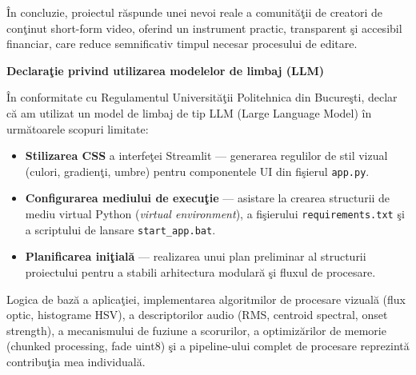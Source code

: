 \documentclass[12pt,a4paper]{article}
\begin{document}
\^{I}n concluzie, proiectul r\u{a}spunde unei nevoi reale a comunit\u{a}\c{t}ii de creatori de con\c{t}inut short-form video, oferind un instrument practic, transparent \c{s}i accesibil financiar, care reduce semnificativ timpul necesar procesului de editare.


\vspace{0.8cm}
\noindent\textbf{Declara\c{t}ie privind utilizarea modelelor de limbaj (LLM)}

\noindent \^{I}n conformitate cu Regulamentul Universit\u{a}\c{t}ii Politehnica din Bucure\c{s}ti, declar c\u{a}{} am utilizat un model de limbaj de tip LLM (Large Language Model) \^{i}n urm\u{a}toarele scopuri limitate:
\begin{itemize}[noitemsep]
    \item \textbf{Stilizarea CSS} a interfe\c{t}ei Streamlit --- generarea regulilor de stil vizual (culori, gradien\c{t}i, umbre) pentru componentele UI din fi\c{s}ierul \texttt{app.py}.
    \item \textbf{Configurarea mediului de execu\c{t}ie} --- asistare la crearea structurii de mediu virtual Python (\textit{virtual environment}), a fi\c{s}ierului \texttt{requirements.txt} \c{s}i a scriptului de lansare \texttt{start\_app.bat}.
    \item \textbf{Planificarea ini\c{t}ial\u{a}} --- realizarea unui plan preliminar al structurii proiectului pentru a stabili arhitectura modular\u{a}{} \c{s}i fluxul de procesare.
\end{itemize}

\noindent Logica de baz\u{a}{} a aplica\c{t}iei, implementarea algoritmilor de procesare vizual\u{a}{} (flux optic, histograme HSV), a descriptorilor audio (RMS, centroid spectral, onset strength), a mecanismului de fuziune a scorurilor, a optimiz\u{a}rilor de memorie (chunked processing, fade uint8) \c{s}i a pipeline-ului complet de procesare reprezint\u{a}{} contribu\c{t}ia mea individual\u{a}.
\end{document}
